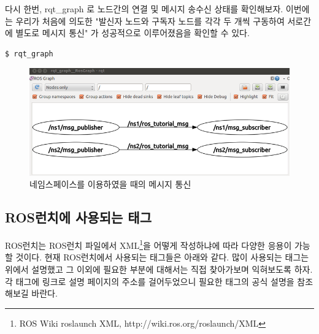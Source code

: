 다시 한번, rqt\_graph 로 노드간의 연결 및 메시지 송수신 상태를 확인해보자. 이번에는 우리가 처음에 의도한 "발신자 노드와 구독자 노드를 각각 두 개씩 구동하여 서로간에 별도로 메시지 통신" 가 성공적으로 이루어졌음을 확인할 수 있다.

\vspace{\baselineskip}
\begin{lstlisting}[language=ROS]
$ rqt_graph
\end{lstlisting}

\begin{figure}[h]
\centering\includegraphics[width=0.9\columnwidth]{pictures/chapter7/rqt_graph_oroca_ros_tutorials_union2.png}
\caption{네임스페이스를 이용하였을 때의 메시지 통신}
\end{figure}

\subsection{ROS런치에 사용되는 태그}

ROS런치는 ROS런치 파일에서 XML\footnote{ROS Wiki roslaunch XML,  http://wiki.ros.org/roslaunch/XML}을 어떻게 작성하냐에 따라 다양한 응용이 가능할 것이다. 현재 ROS런치에서 사용되는 태그들은 아래와 같다. 많이 사용되는 태그는 위에서 설명했고 그 이외에 필요한 부분에 대해서는 직접 찾아가보며 익혀보도록 하자. 각 태그에 링크로 설명 페이지의 주소를 걸어두었으니 필요한 태그의 공식 설명을 참조해보길 바란다.

